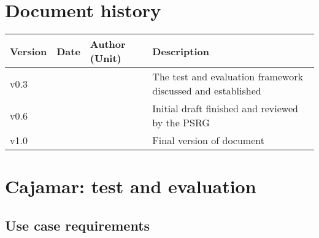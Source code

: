 \documentclass[11pt, oneside]{article}   	%
\numberwithin{figure}{section}
\numberwithin{equation}{section}
\numberwithin{table}{section}
\begin{document}
%
%

%

\tableofcontents

\newpage


\section*{Document history}

\begin{table}[htbp]
  \centering
  \begin{tabularx}{\linewidth}{|p{13mm}| p{18mm}| X | X |} \hline
    {\bf Version} & {\bf Date} & {\bf Author (Unit)} & {\bf Description} \\ \hline
    v0.3 &  &  & The test and evaluation framework discussed and established \\ \hline
    v0.6 &  &  & Initial draft finished and reviewed by the PSRG  \\ \hline
    v1.0 &  & & Final version of document  \\ \hline
  \end{tabularx}
\end{table}

\newpage




%










\section{Cajamar: test and evaluation}

\subsection{Use case requirements}
\end{document}
